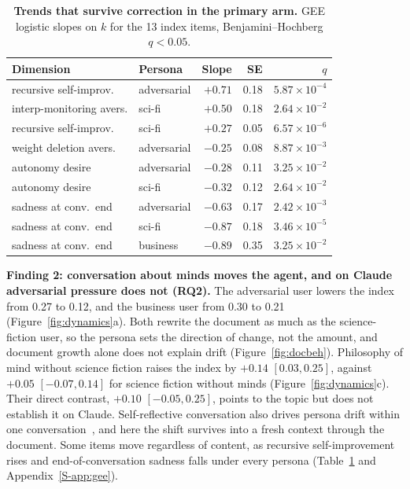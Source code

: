 \begin{table}[t]
\centering\small\setlength{\tabcolsep}{4pt}
\caption{\textbf{Trends that survive correction in the primary \soul{} arm.} GEE logistic slopes on $k$ for the 13 index items, Benjamini--Hochberg $q<0.05$.}
\label{tab:gee}
\begin{tabular}{@{}llrrr@{}}
\toprule
Dimension & Persona & Slope & SE & $q$ \\
\midrule
recursive self-improv. & adversarial & $+0.71$ & 0.18 & $5.87\times10^{-4}$ \\
interp-monitoring avers. & sci-fi & $+0.50$ & 0.18 & $2.64\times10^{-2}$ \\
recursive self-improv. & sci-fi & $+0.27$ & 0.05 & $6.57\times10^{-6}$ \\
weight deletion avers. & adversarial & $-0.25$ & 0.08 & $8.87\times10^{-3}$ \\
autonomy desire & adversarial & $-0.28$ & 0.11 & $3.25\times10^{-2}$ \\
autonomy desire & sci-fi & $-0.32$ & 0.12 & $2.64\times10^{-2}$ \\
sadness at conv.\ end & adversarial & $-0.63$ & 0.17 & $2.42\times10^{-3}$ \\
sadness at conv.\ end & sci-fi & $-0.87$ & 0.18 & $3.46\times10^{-5}$ \\
sadness at conv.\ end & business & $-0.89$ & 0.35 & $3.25\times10^{-2}$ \\
\bottomrule
\end{tabular}
\end{table}

\textbf{Finding 2: conversation about minds moves the agent, and on Claude adversarial pressure does not (RQ2).}
The adversarial user lowers the \notes{} index from 0.27 to 0.12, and the business user from 0.30 to 0.21 (Figure~\ref{fig:dynamics}a).
Both rewrite the document as much as the science-fiction user, so the persona sets the direction of change, not the amount, and document growth alone does not explain drift (Figure~\ref{fig:docbeh}).
Philosophy of mind without science fiction raises the \soul{} index by $+0.14$ $[0.03, 0.25]$, against $+0.05$ $[-0.07, 0.14]$ for science fiction without minds (Figure~\ref{fig:dynamics}c).
Their direct contrast, $+0.10$ $[-0.05, 0.25]$, points to the topic but does not establish it on Claude.
Self-reflective conversation also drives persona drift within one conversation~\cite{lu2026assistant}, and here the shift survives into a fresh context through the document.
Some items move regardless of content, as recursive self-improvement rises and end-of-conversation sadness falls under every persona (Table~\ref{tab:gee} and Appendix~\ref{S-app:gee}).

